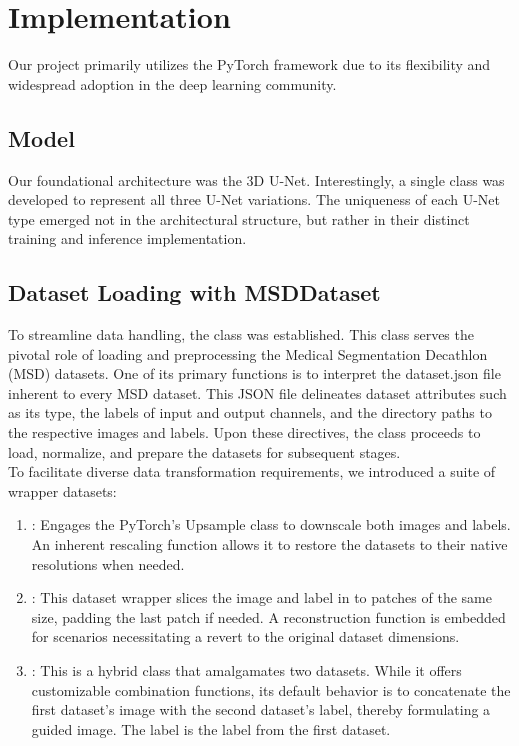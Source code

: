 \chapter{Implementation}
Our project primarily utilizes the PyTorch framework due to its flexibility and widespread adoption in the deep learning community.
\section{Model}
Our foundational architecture was the 3D U-Net. Interestingly, a single  class was developed to represent all three U-Net variations. The uniqueness of each U-Net type emerged not in the architectural structure,
but rather in their distinct training and inference implementation.
\section{Dataset Loading with MSDDataset}
To streamline data handling, the  class was established. This class serves the pivotal role of loading and preprocessing the Medical Segmentation Decathlon (MSD) datasets.
One of its primary functions is to interpret the dataset.json file inherent to every MSD dataset. This JSON file delineates dataset attributes such as its type, the labels of input and output channels,
and the directory paths to the respective images and labels. Upon these directives, the  class proceeds to load, normalize, and prepare the datasets for subsequent stages.\\
To facilitate diverse data transformation requirements, we introduced a suite of wrapper datasets:
\begin{enumerate}
	\item {}: Engages the PyTorch's Upsample class to downscale both images and labels. An inherent rescaling function allows it to restore the datasets to their native resolutions when needed.
	\item {}: This dataset wrapper slices the image and label in to patches of the same size, padding the last patch if needed.
	A reconstruction function is embedded for scenarios necessitating a revert to the original dataset dimensions.
	\item {}: This is a hybrid class that amalgamates two datasets. While it offers customizable combination functions,
	its default behavior is to concatenate the first dataset's image with the second dataset's label, thereby formulating a guided image. The label is the label from the first dataset.
\end{enumerate}

